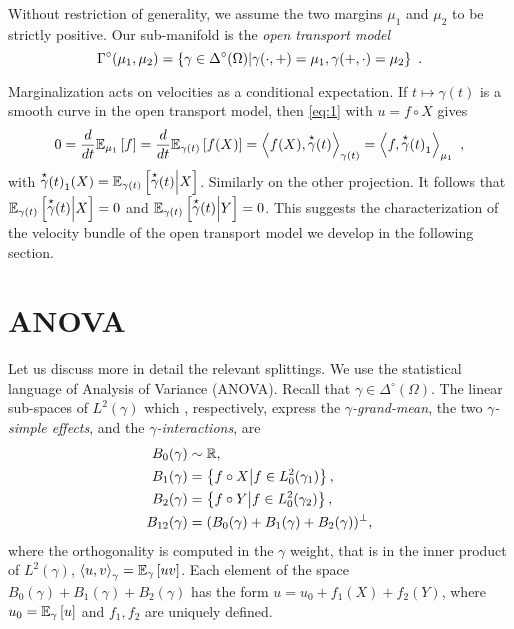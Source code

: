 \documentclass[runningheads]{llncs}
\begin{document}
Without restriction of generality, we assume the two margins $\mu_1$ and $\mu_2$ to be strictly positive. Our sub-manifold is the \emph{open transport model}
\begin{equation*} \Gamma^\circ(\mu_1,\mu_2) = \setof{\gamma \in \Delta^\circ(\Omega)}{\gamma(\cdot,+) = \mu_1, \gamma(+,\cdot) = \mu_2} \ .
\end{equation*}

Marginalization acts on velocities as a conditional expectation. If $t \mapsto \gamma(t)$ is a smooth curve in the open transport model, then \cref{eq:1} with $u = f \circ X$ gives \begin{equation*} 0 = \derivby t \expectat {\mu_1} f =  \derivby t \expectat {\gamma(t)} {f(X)} = \scalarat {\gamma(t)}  {f(X)} {\velocity \gamma(t)} = \scalarat {\mu_1}  f {{\velocity \gamma(t)}_1} \ , \end{equation*} with ${\velocity \gamma(t)}_1(X) = \condexpectat {\gamma(t)} {\velocity \gamma(t)} X$. Similarly on the other projection. It follows that $\condexpectat {\gamma(t)} {\velocity \gamma(t)} X = 0$ and $\condexpectat {\gamma(t)} {\velocity \gamma(t)} Y = 0$. This suggests the characterization of the velocity bundle of the open transport model we develop in the following section.

\section{ANOVA}

Let us discuss more in detail the relevant splittings. We use the statistical language of Analysis of Variance (ANOVA). Recall that $\gamma \in \Delta^\circ(\Omega)$. The linear sub-spaces of $L^2(\gamma)$ which , respectively, express the \emph{$\gamma$-grand-mean}, the two \emph{$\gamma$-simple effects}, and the \emph{$\gamma$-interactions}, are
\begin{equation}\label{eq:ANOVA-spaces} \begin{aligned} B_0(\gamma) &\sim \reals, \\ B_1(\gamma) &= \setof{f\circ X}{f \in L^2_0(\gamma_1)},\\ B_2(\gamma) &= \setof{f\circ Y}{f \in L^2_0(\gamma_2)},\\ B_{12}(\gamma) &= (B_0(\gamma) + B_1(\gamma) + B_2(\gamma))^\perp, \end{aligned} \end{equation}
where the orthogonality is computed in the $\gamma$ weight, that is in the inner product of $L^2(\gamma)$, $\scalarat \gamma u v = \expectat \gamma {uv}$. Each element of the space $B_0(\gamma) + B_1(\gamma) + B_2(\gamma)$ has the form $u = u_0 + f_1(X) + f_2(Y)$, where $u_0 = \expectat \gamma u$ and $f_1,f_2$ are uniquely defined. 
\end{document}
